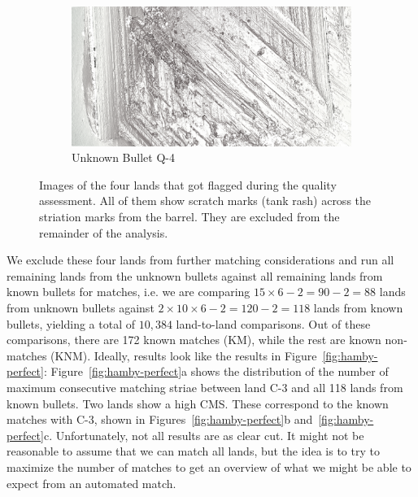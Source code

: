 \documentclass[aoas, preprint]{imsart}\usepackage[]{graphicx}\usepackage[]{color}
\begin{document}
\begin{figure}
\begin{subfigure}[t]{.49\textwidth}
\end{subfigure}
\begin{subfigure}[t]{.49\textwidth}\centering
\caption{Unknown Bullet Q-4}
\includegraphics[width=\textwidth]{images/q-4-grey.png}
\end{subfigure}
\caption{\label{fig:fourflags}Images of the four lands that got flagged during the quality assessment. All of them show scratch marks (tank rash) across the striation marks from the barrel. They are excluded from the remainder of the analysis.}
\end{figure}
%
We exclude these four lands from further matching considerations and
 run all remaining lands from the unknown bullets against all remaining lands from known bullets for matches, i.e. we are comparing $15 \times 6 -2 = 90 - 2 = 88$ lands from unknown bullets against $2 \times 10 \times 6 -2 = 120 - 2 = 118$ lands from known bullets, yielding a total of $10,384$ land-to-land comparisons. Out of these comparisons, there are 172 known matches (KM), while the rest are known non-matches (KNM). 
Ideally, results look like the results in Figure~\ref{fig:hamby-perfect}: Figure~\ref{fig:hamby-perfect}a shows the distribution of the number of maximum consecutive matching striae between land C-3 and all 118 lands from known bullets. Two lands show a high CMS. These correspond to the known matches with C-3, shown in Figures~\ref{fig:hamby-perfect}b and~\ref{fig:hamby-perfect}c. 
 Unfortunately, not all results are as clear cut. 
It might not be reasonable to assume that we can match all lands, but the idea is to try to maximize the number of matches to get an overview of what we might be able to expect from an automated match. 
\end{document}
